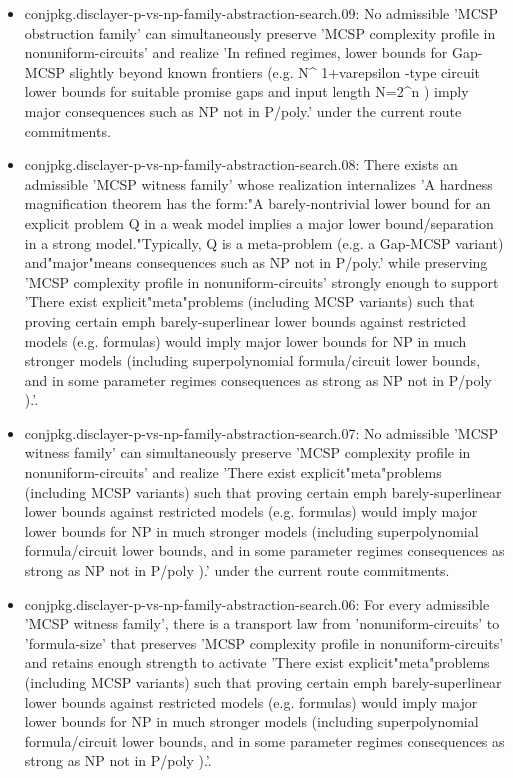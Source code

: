 \documentclass[11pt]{article}
\begin{document}
\begin{itemize}
\item conjpkg.disclayer-p-vs-np-family-abstraction-search.09: No admissible 'MCSP obstruction family' can simultaneously preserve 'MCSP complexity profile in nonuniform-circuits' and realize 'In refined regimes, lower bounds for Gap-MCSP slightly beyond known frontiers (e.g. N\textasciicircum{} 1+varepsilon -type circuit lower bounds for suitable promise gaps and input length N=2\textasciicircum{}n ) imply major consequences such as NP not in P/poly.' under the current route commitments.
\item conjpkg.disclayer-p-vs-np-family-abstraction-search.08: There exists an admissible 'MCSP witness family' whose realization internalizes 'A hardness magnification theorem has the form:"A barely-nontrivial lower bound for an explicit problem Q in a weak model implies a major lower bound/separation in a strong model."Typically, Q is a meta-problem (e.g. a Gap-MCSP variant) and"major"means consequences such as NP not in P/poly.' while preserving 'MCSP complexity profile in nonuniform-circuits' strongly enough to support 'There exist explicit"meta"problems (including MCSP variants) such that proving certain emph barely-superlinear lower bounds against restricted models (e.g. formulas) would imply major lower bounds for NP in much stronger models (including superpolynomial formula/circuit lower bounds, and in some parameter regimes consequences as strong as NP not in P/poly ).'.
\item conjpkg.disclayer-p-vs-np-family-abstraction-search.07: No admissible 'MCSP witness family' can simultaneously preserve 'MCSP complexity profile in nonuniform-circuits' and realize 'There exist explicit"meta"problems (including MCSP variants) such that proving certain emph barely-superlinear lower bounds against restricted models (e.g. formulas) would imply major lower bounds for NP in much stronger models (including superpolynomial formula/circuit lower bounds, and in some parameter regimes consequences as strong as NP not in P/poly ).' under the current route commitments.
\item conjpkg.disclayer-p-vs-np-family-abstraction-search.06: For every admissible 'MCSP witness family', there is a transport law from 'nonuniform-circuits' to 'formula-size' that preserves 'MCSP complexity profile in nonuniform-circuits' and retains enough strength to activate 'There exist explicit"meta"problems (including MCSP variants) such that proving certain emph barely-superlinear lower bounds against restricted models (e.g. formulas) would imply major lower bounds for NP in much stronger models (including superpolynomial formula/circuit lower bounds, and in some parameter regimes consequences as strong as NP not in P/poly ).'.

\end{itemize}
\end{document}
